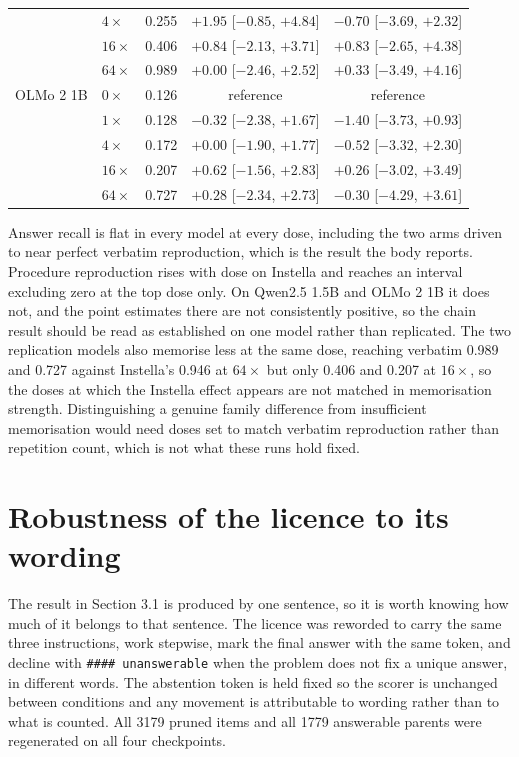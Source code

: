 \documentclass{article}
\begin{document}
\begin{table}[h]
\begin{tabular}{llccc}
            & $4\times$ & 0.255 & $+1.95$ [$-0.85$, $+4.84$] & $-0.70$ [$-3.69$, $+2.32$] \\
            & $16\times$ & 0.406 & $+0.84$ [$-2.13$, $+3.71$] & $+0.83$ [$-2.65$, $+4.38$] \\
            & $64\times$ & 0.989 & $+0.00$ [$-2.46$, $+2.52$] & $+0.33$ [$-3.49$, $+4.16$] \\
\midrule
OLMo 2 1B   & $0\times$ & 0.126 & reference & reference \\
            & $1\times$ & 0.128 & $-0.32$ [$-2.38$, $+1.67$] & $-1.40$ [$-3.73$, $+0.93$] \\
            & $4\times$ & 0.172 & $+0.00$ [$-1.90$, $+1.77$] & $-0.52$ [$-3.32$, $+2.30$] \\
            & $16\times$ & 0.207 & $+0.62$ [$-1.56$, $+2.83$] & $+0.26$ [$-3.02$, $+3.49$] \\
            & $64\times$ & 0.727 & $+0.28$ [$-2.34$, $+2.73$] & $-0.30$ [$-4.29$, $+3.61$] \\
\bottomrule
\end{tabular}
\end{table}

Answer recall is flat in every model at every dose, including the two arms driven to near
perfect verbatim reproduction, which is the result the body reports. Procedure reproduction
rises with dose on Instella and reaches an interval excluding zero at the top dose only. On
Qwen2.5 1.5B and OLMo 2 1B it does not, and the point estimates there are not consistently
positive, so the chain result should be read as established on one model rather than
replicated. The two replication models also memorise less at the same dose, reaching verbatim
0.989 and 0.727 against Instella's 0.946 at $64\times$ but only 0.406 and 0.207 at
$16\times$, so the doses at which the Instella effect appears are not matched in
memorisation strength. Distinguishing a genuine family difference from insufficient
memorisation would need doses set to match verbatim reproduction rather than repetition
count, which is not what these runs hold fixed.

\section{Robustness of the licence to its wording}
\label{app:reword}

The result in Section 3.1 is produced by one sentence, so it is worth knowing how much of it
belongs to that sentence. The licence was reworded to carry the same three instructions,
work stepwise, mark the final answer with the same token, and decline with
\texttt{\#\#\#\# unanswerable} when the problem does not fix a unique answer, in different
words. The abstention token is held fixed so the scorer is unchanged between conditions and
any movement is attributable to wording rather than to what is counted. All 3179 pruned
items and all 1779 answerable parents were regenerated on all four checkpoints.
\end{document}
